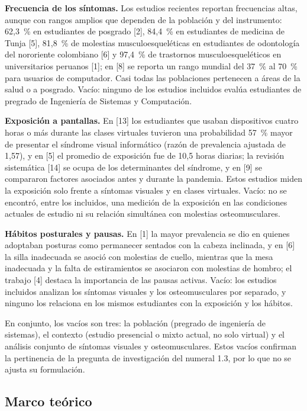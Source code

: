 \noindent\textbf{Frecuencia de los síntomas.} Los estudios recientes reportan frecuencias
altas, aunque con rangos amplios que dependen de la población y del instrumento: 62,3~\%
en estudiantes de posgrado [2], 84,4~\% en estudiantes de medicina de Tunja [5], 81,8~\%
de molestias musculoesqueléticas en estudiantes de odontología del nororiente colombiano
[6] y 97,4~\% de trastornos musculoesqueléticos en universitarios peruanos [1]; en [8] se
reporta un rango mundial del 37~\% al 70~\% para usuarios de computador. Casi todas las
poblaciones pertenecen a áreas de la salud o a posgrado. Vacío: ninguno de los estudios
incluidos evalúa estudiantes de pregrado de Ingeniería de Sistemas y Computación.

\medskip
\noindent\textbf{Exposición a pantallas.} En [13] los estudiantes que usaban dispositivos
cuatro horas o más durante las clases virtuales tuvieron una probabilidad 57~\% mayor de
presentar el síndrome visual informático (razón de prevalencia ajustada de 1,57), y en [5]
el promedio de exposición fue de 10,5 horas diarias; la revisión sistemática [14] se ocupa
de los determinantes del síndrome, y en [9] se compararon factores asociados antes y
durante la pandemia. Estos estudios miden la exposición solo frente a síntomas visuales y
en clases virtuales. Vacío: no se encontró, entre los incluidos, una medición de la
exposición en las condiciones actuales de estudio ni su relación simultánea con
molestias osteomusculares.

\medskip
\noindent\textbf{Hábitos posturales y pausas.} En [1] la mayor prevalencia se dio en
quienes adoptaban posturas como permanecer sentados con la cabeza inclinada, y en [6] la
silla inadecuada se asoció con molestias de cuello, mientras que la mesa inadecuada y la
falta de estiramientos se asociaron con molestias de hombro; el trabajo [4] destaca la
importancia de las pausas activas. Vacío: los estudios incluidos analizan los síntomas
visuales y los osteomusculares por separado, y ninguno los relaciona en los mismos
estudiantes con la exposición y los hábitos.

\medskip
\noindent En conjunto, los vacíos son tres: la población (pregrado de ingeniería de
sistemas), el contexto (estudio presencial o mixto actual, no solo virtual) y el análisis
conjunto de síntomas visuales y osteomusculares. Estos vacíos confirman la pertinencia de
la pregunta de investigación del numeral 1.3, por lo que no se ajusta su formulación.

\subsection{Marco teórico}

